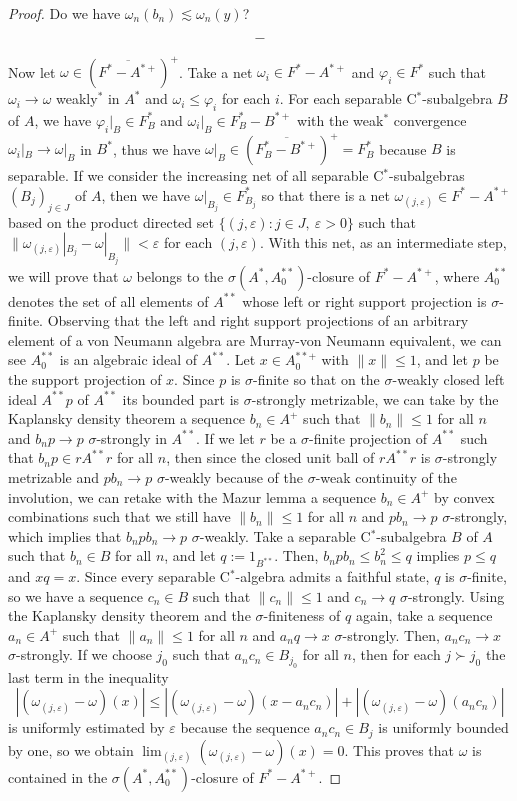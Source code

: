 \documentclass[a4paper]{amsart}
\newcommand{\e}{\varepsilon}
\theoremstyle{plain}
\theoremstyle{definition}
\begin{document}
\begin{proof}
Do we have $\omega_n(b_n)\lesssim\omega_n(y)$?


\[-\]

Now let $\omega\in(\overline{F^*-A^{*+}})^+$.
Take a net $\omega_i\in F^*-A^{*+}$ and $\varphi_i\in F^*$ such that $\omega_i\to\omega$ weakly$^*$ in $A^*$ and $\omega_i\le\varphi_i$ for each $i$.
For each separable C$^*$-subalgebra $B$ of $A$, we have $\varphi_i|_B\in F^*_{B}$ and $\omega_i|_B\in F^*_B-B^{*+}$ with the weak$^*$ convergence $\omega_i|_B\to\omega|_B$ in $B^*$, thus we have $\omega|_B\in(\overline{F_B^*-B^{*+}})^+=F_B^*$ because $B$ is separable.
If we consider the increasing net of all separable C$^*$-subalgebras $(B_j)_{j\in J}$ of $A$, then we have $\omega|_{B_j}\in F_{B_j}^*$ so that there is a net $\omega_{(j,\e)}\in F^*-A^{*+}$ based on the product directed set $\{(j,\e):j\in J,\ \e>0\}$ such that $\|\omega_{(j,\e)}|_{B_j}-\omega|_{B_j}\|<\e$ for each $(j,\e)$.
With this net, as an intermediate step, we will prove that $\omega$ belongs to the $\sigma(A^*,A_0^{**})$-closure of $F^*-A^{*+}$, where $A_0^{**}$ denotes the set of all elements of $A^{**}$ whose left or right support projection is $\sigma$-finite.
Observing that the left and right support projections of an arbitrary element of a von Neumann algebra are Murray-von Neumann equivalent, we can see $A_0^{**}$ is an algebraic ideal of $A^{**}$.
Let $x\in A_0^{**+}$ with $\|x\|\le1$, and let $p$ be the support projection of $x$.
Since $p$ is $\sigma$-finite so that on the $\sigma$-weakly closed left ideal $A^{**}p$ of $A^{**}$ its bounded part is $\sigma$-strongly metrizable, we can take by the Kaplansky density theorem a sequence $b_n\in A^+$ such that $\|b_n\|\le1$ for all $n$ and $b_np\to p$ $\sigma$-strongly in $A^{**}$.
If we let $r$ be a $\sigma$-finite projection of $A^{**}$ such that $b_np\in rA^{**}r$ for all $n$, then since the closed unit ball of $rA^{**}r$ is $\sigma$-strongly metrizable and $pb_n\to p$ $\sigma$-weakly because of the $\sigma$-weak continuity of the involution, we can retake with the Mazur lemma a sequence $b_n\in A^+$ by convex combinations such that we still have $\|b_n\|\le1$ for all $n$ and $pb_n\to p$ $\sigma$-strongly, which implies that $b_npb_n\to p$ $\sigma$-weakly.
Take a separable C$^*$-subalgebra $B$ of $A$ such that $b_n\in B$ for all $n$, and let $q:=1_{B^{**}}$.
Then, $b_npb_n\le b_n^2\le q$ implies $p\le q$ and $xq=x$.
Since every separable C$^*$-algebra admits a faithful state, $q$ is $\sigma$-finite, so we have a sequence $c_n\in B$ such that $\|c_n\|\le1$ and $c_n\to q$ $\sigma$-strongly.
Using the Kaplansky density theorem and the $\sigma$-finiteness of $q$ again, take a sequence $a_n\in A^+$ such that $\|a_n\|\le1$ for all $n$ and $a_nq\to x$ $\sigma$-strongly.
Then, $a_nc_n\to x$ $\sigma$-strongly.
If we choose $j_0$ such that $a_nc_n\in B_{j_0}$ for all $n$, then for each $j\succ j_0$ the last term in the inequality 
\[|(\omega_{(j,\e)}-\omega)(x)|\le|(\omega_{(j,\e)}-\omega)(x-a_nc_n)|+|(\omega_{(j,\e)}-\omega)(a_nc_n)|\]
is uniformly estimated by $\e$ because the sequence $a_nc_n\in B_j$ is uniformly bounded by one, so we obtain $\lim_{(j,\e)}(\omega_{(j,\e)}-\omega)(x)=0$.
This proves that $\omega$ is contained in the $\sigma(A^*,A_0^{**})$-closure of $F^*-A^{*+}$.




\end{proof}
\end{document}
